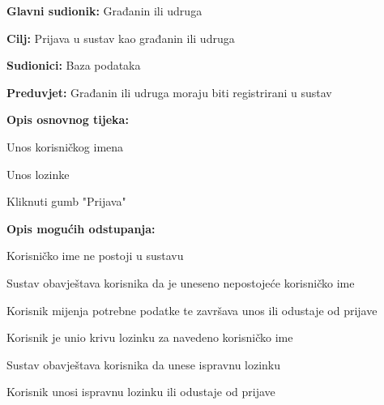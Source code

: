				\noindent {}
					\begin{packed_item}
						
						\item \textbf{Glavni sudionik: } Građanin ili udruga
						\item  \textbf{Cilj:} Prijava u sustav kao građanin ili udruga
						\item  \textbf{Sudionici:} Baza podataka
						\item  \textbf{Preduvjet:} Građanin ili udruga moraju biti registrirani u sustav
						\item  \textbf{Opis osnovnog tijeka:}
						
						\item[] \begin{packed_enum}
							
							\item Unos korisničkog imena
							\item Unos lozinke
							\item Kliknuti gumb "Prijava"
						\end{packed_enum}
						
						\item  \textbf{Opis mogućih odstupanja:}
						
						\item[] \begin{packed_item}
							
							\item[1.a] Korisničko ime ne postoji u sustavu
							\item[] \begin{packed_enum}
								
								\item Sustav obavještava korisnika da je uneseno nepostojeće 
								korisničko ime
								\item Korisnik mijenja potrebne podatke te završava unos ili odustaje 
								od prijave
								
								
								
							\end{packed_enum}
							\item[2.a] Korisnik je unio krivu lozinku za navedeno korisničko ime
							\item[] \begin{packed_enum}
								
								\item Sustav obavještava korisnika da unese ispravnu lozinku
								\item Korisnik unosi ispravnu lozinku ili odustaje 
								od prijave
								
							\end{packed_enum}	
							
						\end{packed_item}
					\end{packed_item}
					
